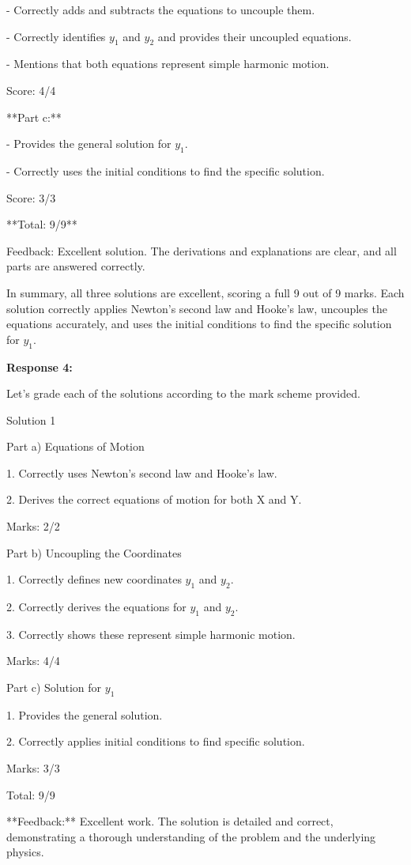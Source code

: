 \documentclass[a4paper,11pt]{article}
\begin{document}
- Correctly adds and subtracts the equations to uncouple them.

- Correctly identifies \(y_1\) and \(y_2\) and provides their uncoupled equations.

- Mentions that both equations represent simple harmonic motion.
  
Score: 4/4

**Part c:**

- Provides the general solution for \(y_1\).

- Correctly uses the initial conditions to find the specific solution.
  
Score: 3/3

**Total: 9/9**

Feedback: Excellent solution. The derivations and explanations are clear, and all parts are answered correctly.

In summary, all three solutions are excellent, scoring a full 9 out of 9 marks. Each solution correctly applies Newton's second law and Hooke's law, uncouples the equations accurately, and uses the initial conditions to find the specific solution for \(y_1\).

\bigskip
\textbf{Response 4:}

Let's grade each of the solutions according to the mark scheme provided.

Solution 1

Part a) Equations of Motion

1. Correctly uses Newton's second law and Hooke's law.

2. Derives the correct equations of motion for both X and Y.

Marks: 2/2

Part b) Uncoupling the Coordinates

1. Correctly defines new coordinates \(y_1\) and \(y_2\).

2. Correctly derives the equations for \(y_1\) and \(y_2\).

3. Correctly shows these represent simple harmonic motion.

Marks: 4/4

Part c) Solution for \(y_1\)

1. Provides the general solution.

2. Correctly applies initial conditions to find specific solution.

Marks: 3/3

Total: 9/9

**Feedback:** Excellent work. The solution is detailed and correct, demonstrating a thorough understanding of the problem and the underlying physics.
\end{document}
